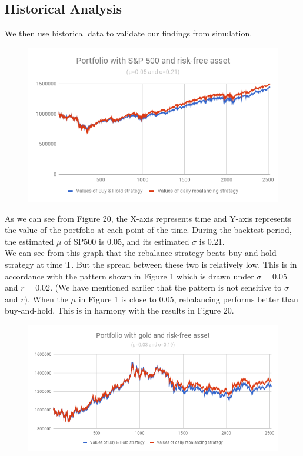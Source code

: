 \documentclass[
10pt, %
a4paper, %
oneside, %
headinclude,footinclude, %
BCOR5mm, %
]{scrartcl}
\begin{document}
\subsection{Historical Analysis}
We then use historical data to validate our findings from simulation.
\begin{figure}[H]
	\centering
	\includegraphics[width=0.7\linewidth]{sp500}
	\caption{}
	\label{fig:sp500}
\end{figure}
As we can see from Figure 20, the X-axis represents time and Y-axis represents the value of the portfolio at each point of the time. During the backtest period, the estimated $\mu$ of SP500 is 0.05, and its estimated $\sigma$ is 0.21. \\

We can see from this graph that the rebalance strategy beats buy-and-hold strategy at time T. But the spread between these two is relatively low. This is in accordance with the pattern shown in Figure 1 which is drawn under $\sigma = 0.05$ and $r = 0.02$. (We have mentioned earlier that the pattern is not sensitive to $\sigma$ and $r$). When the $\mu$ in Figure 1 is close to 0.05, rebalancing performs better than buy-and-hold. This is in harmony with the results in Figure 20.\\

\begin{figure}[H]
	\centering
	\includegraphics[width=0.7\linewidth]{gold}
	\caption{}
	\label{fig:gold}
\end{figure}
\end{document}
